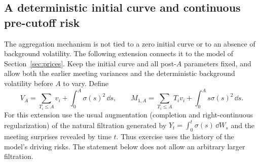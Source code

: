 \subsection{A deterministic initial curve and continuous pre-cutoff risk}
The aggregation mechanism is not tied to a zero initial curve or to an absence of background volatility. The following extension connects it to the model of Section~\ref{sec:prices}. Keep the initial curve and all post-$A$ parameters fixed, and allow both the earlier meeting variances and the deterministic background volatility before $A$ to vary. Define
\begin{equation}\label{eq:generalaggregates}
V_A=\sum_{T_i\leq A}v_i+\int_0^A\sigma(s)^2\,\dd s,\qquad
M_{1,A}=\sum_{T_i\leq A}T_i v_i+\int_0^A s\sigma(s)^2\,\dd s.
\end{equation}
For this extension use the usual augmentation (completion and right-continuous regularization) of the natural filtration generated by
$Y_t=\int_0^t\sigma(s)\,\dd W_s$ and the meeting surprises revealed by time $t$. Thus exercise uses the history of the model's driving risks. The statement below does not allow an arbitrary larger filtration.

